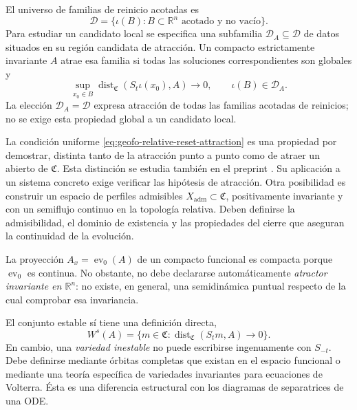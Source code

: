 \begin{definition}
\label{def:geofo-reset-family-attraction}
El universo de familias de reinicio acotadas es
\begin{equation}
 \mathcal D=\{\iota(B):B\subset\mathbb R^n\text{ acotado y no vacío}\}.
 \label{eq:geofo-reset-universe}
\end{equation}
Para estudiar un candidato local se especifica una subfamilia
\(\mathcal D_A\subseteq\mathcal D\) de datos situados en su región
candidata de atracción. Un compacto estrictamente invariante \(A\)
atrae esa familia si todas las soluciones correspondientes son globales y
\begin{equation}
 \sup_{x_0\in B}
 \operatorname{dist}_{\mathfrak C}(S_t\iota(x_0),A)\longrightarrow0,
 \qquad \iota(B)\in\mathcal D_A.
 \label{eq:geofo-relative-reset-attraction}
\end{equation}
La elección \(\mathcal D_A=\mathcal D\) expresa atracción de todas las
familias acotadas de reinicios; no se exige esta propiedad global a un
candidato local.
\end{definition}

La condición uniforme \cref{eq:geofo-relative-reset-attraction} es una
propiedad por demostrar, distinta tanto de la atracción punto a punto como
de atraer un abierto de \(\mathfrak C\). Esta distinción se estudia también
en el preprint \cite{CuiKloedenXin2026CaputoDynamics}. Su aplicación a un
sistema concreto exige verificar las hipótesis de atracción. Otra posibilidad es
construir un espacio de perfiles admisibles
\(X_{\mathrm{adm}}\subset\mathfrak C\), positivamente invariante y con un
semiflujo continuo en la topología relativa. Deben definirse la admisibilidad,
el dominio de existencia y las propiedades del cierre que aseguran la
continuidad de la evolución.

La proyección \(A_x=\operatorname{ev}_0(A)\) de un compacto funcional es
compacta porque \(\operatorname{ev}_0\) es continua. No obstante, no debe
declararse automáticamente \emph{atractor invariante en \(\mathbb R^n\)}: no
existe, en general, una semidinámica puntual respecto de la cual comprobar esa
invariancia.

El conjunto estable sí tiene una definición directa,
\begin{equation}
 W^s(A)=\{m\in\mathfrak C:
 \operatorname{dist}_{\mathfrak C}(S_tm,A)\to0\}.
 \label{eq:geofo-stable-set}
\end{equation}
En cambio, una \emph{variedad inestable} no puede escribirse ingenuamente con
\(S_{-t}\). Debe definirse mediante órbitas completas que existan en el
espacio funcional o mediante una teoría específica de variedades invariantes
para ecuaciones de Volterra. Ésta es una diferencia estructural con los
diagramas de separatrices de una ODE.

